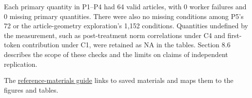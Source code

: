 Each primary quantity in P1--P4 had 64 valid articles, with 0 worker failures and 0 missing primary quantities. There were also no missing conditions among P5's 72 or the article-geometry exploration's 1,152 conditions. Quantities undefined by the measurement, such as post-treatment norm correlations under C4 and first-token contribution under C1, were retained as NA in the tables. Section 8.6 describes the scope of these checks and the limits on claims of independent replication.

The \href{https://github.com/metaSATOKEN/manifold_topology_experiment/blob/main/references/README.md}{reference-materials guide} links to saved materials and maps them to the figures and tables.
